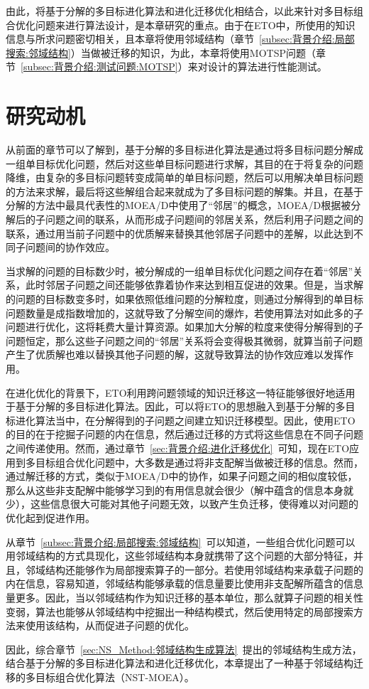 \par
由此，将基于分解的多目标进化算法和进化迁移优化相结合，以此来针对多目标组合优化问题来进行算法设计，是本章研究的重点。由于在ETO中，所使用的知识信息与所求问题密切相关，且本章将使用邻域结构（章节~\ref{subsec:背景介绍:局部搜索:邻域结构}）当做被迁移的知识，为此，本章将使用MOTSP问题（章节~\ref{subsec:背景介绍:测试问题:MOTSP}）来对设计的算法进行性能测试。

\section{研究动机}
\label{sec:NST:研究动机}
从前面的章节可以了解到，基于分解的多目标进化算法是通过将多目标问题分解成一组单目标优化问题，然后对这些单目标问题进行求解，其目的在于将复杂的问题降维，由复杂的多目标问题转变成简单的单目标问题，然后可以用解决单目标问题的方法来求解，最后将这些解组合起来就成为了多目标问题的解集。并且，在基于分解的方法中最具代表性的MOEA/D中使用了“邻居”的概念，MOEA/D根据被分解后的子问题之间的联系，从而形成子问题间的邻居关系，然后利用子问题之间的联系，通过用当前子问题中的优质解来替换其他邻居子问题中的差解，以此达到不同子问题间的协作效应。
\par
当求解的问题的目标数少时，被分解成的一组单目标优化问题之间存在着“邻居”关系，此时邻居子问题之间还能够依靠着协作来达到相互促进的效果。但是，当求解的问题的目标数变多时，如果依照低维问题的分解粒度，则通过分解得到的单目标问题数量是成指数增加的，这就导致了分解空间的爆炸，若使用算法对如此多的子问题进行优化，这将耗费大量计算资源。如果加大分解的粒度来使得分解得到的子问题恒定，那么这些子问题之间的“邻居”关系将会变得极其微弱，就算当前子问题产生了优质解也难以替换其他子问题的解，这就导致算法的协作效应难以发挥作用。
\par
在进化优化的背景下，ETO利用跨问题领域的知识迁移这一特征能够很好地适用于基于分解的多目标进化算法。因此，可以将ETO的思想融入到基于分解的多目标进化算法当中，在分解得到的子问题之间建立知识迁移模型。因此，使用ETO的目的在于挖掘子问题的内在信息，然后通过迁移的方式将这些信息在不同子问题之间传递使用。然而，通过章节~\ref{sec:背景介绍:进化迁移优化}~可知，现在ETO应用到多目标组合优化问题中，大多数是通过将非支配解当做被迁移的信息。然而，通过解迁移的方式，类似于MOEA/D中的协作，如果子问题之间的相似度较低，那么从这些非支配解中能够学习到的有用信息就会很少（解中蕴含的信息本身就少），这些信息很大可能对其他子问题无效，以致产生负迁移，使得难以对问题的优化起到促进作用。
\par
从章节~\ref{subsec:背景介绍:局部搜索:邻域结构}~可以知道，一些组合优化问题可以用邻域结构的方式具现化，这些邻域结构本身就携带了这个问题的大部分特征，并且，邻域结构还能够作为局部搜索算子的一部分。若使用邻域结构来承载子问题的内在信息，容易知道，邻域结构能够承载的信息量要比使用非支配解所蕴含的信息量更多。因此，当以邻域结构作为知识迁移的基本单位，那么就算子问题的相关性变弱，算法也能够从邻域结构中挖掘出一种结构模式，然后使用特定的局部搜索方法来使用该结构，从而促进子问题的优化。
\par
因此，综合章节~\ref{sec:NS_Method:邻域结构生成算法}~提出的邻域结构生成方法，结合基于分解的多目标进化算法和进化迁移优化，本章提出了一种基于邻域结构迁移的多目标组合优化算法（NST-MOEA）。

